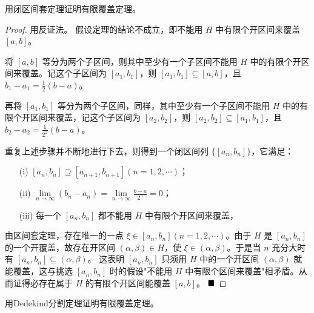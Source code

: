 \begin{problem}
    用闭区间套定理证明有限覆盖定理。
\end{problem}

\begin{proof}
    用反证法。
    假设定理的结论不成立，即不能用 $H$ 中有限个开区间来覆盖 $[a,b]$。
    
    将 $[a,b]$ 等分为两个子区间，则其中至少有一个子区间不能用 $H$ 中的有限个开区间来覆盖。记这个子区间为 $[a_1,b_1]$，则 $[a_1,b_1]\subseteq[a,b]$，且 $b_1-a_1=\frac{1}{2}(b-a)$。
    
    再将 $[a_1,b_1]$ 等分为两个子区间，同样，其中至少有一个子区间不能用 $H$ 中的有限个开区间来覆盖，记这个子区间为 $[a_2,b_2]$，则 $[a_2,b_2]\subseteq[a_1,b_1]$，且 $b_2-a_2=\frac{1}{2^2}(b-a)$。
    
    重复上述步骤并不断地进行下去，则得到一个闭区间列 $\{[a_n,b_n]\}$，它满足：
    \begin{enumerate}
    \item[(i)] $[a_n,b_n]\supseteq[a_{n+1},b_{n+1}](n=1,2,\cdots)$；
    \item[(ii)] $\lim\limits_{n\to\infty}(b_n-a_n)=\lim\limits_{n\to\infty}\frac{b-a}{2^n}=0$；
    \item[(iii)] 每一个 $[a_n,b_n]$ 都不能用 $H$ 中有限个开区间来覆盖，
    \end{enumerate}
    
    由区间套定理，存在唯一的一点 $\xi\in[a_n,b_n](n=1,2,\cdots)$。由于 $H$ 是 $[a_n,b_n]$ 的一个开覆盖，故存在开区间 $(\alpha,\beta)\in H$，使 $\xi\in(\alpha,\beta)$。于是当 $n$ 充分大时有 $[a_n,b_n]\subseteq(\alpha,\beta)$。
    这表明 $[a_n,b_n]$ 只须用 $H$ 中的一个开区间 $(\alpha,\beta)$ 就能覆盖，这与挑选 $[a_n,b_n]$ 时的假设"不能用 $H$ 中有限个区间来覆盖"相矛盾。从而证得必存在属于 $H$ 的有限个开区间能覆盖 $[a,b]$。    
    $\hfill \blacksquare$
\end{proof}


\begin{problem}
    用Dedekind分割定理证明有限覆盖定理。
\end{problem}

